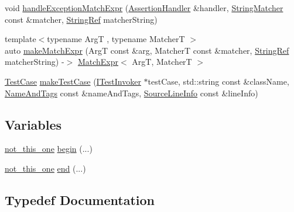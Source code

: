 \begin{DoxyCompactItemize}
\item 
void \mbox{\hyperlink{namespace_catch_a59e375ed0dbd3d6e2f5a29c86c4d8042}{handle\+Exception\+Match\+Expr}} (\mbox{\hyperlink{class_catch_1_1_assertion_handler}{Assertion\+Handler}} \&handler, \mbox{\hyperlink{namespace_catch_aba438977e831821a2eeca82b9b4f4af2}{String\+Matcher}} const \&matcher, \mbox{\hyperlink{class_catch_1_1_string_ref}{String\+Ref}} matcher\+String)
\item 
{\footnotesize template$<$typename ArgT , typename MatcherT $>$ }\\auto \mbox{\hyperlink{namespace_catch_a08c0e847b66dc31e1174aa9a74a441c9}{make\+Match\+Expr}} (ArgT const \&arg, MatcherT const \&matcher, \mbox{\hyperlink{class_catch_1_1_string_ref}{String\+Ref}} matcher\+String) -\/$>$ \mbox{\hyperlink{class_catch_1_1_match_expr}{Match\+Expr}}$<$ ArgT, MatcherT $>$
\item 
\mbox{\hyperlink{class_catch_1_1_test_case}{Test\+Case}} \mbox{\hyperlink{namespace_catch_a5e63df38d06a43d4cee17454e724b5c0}{make\+Test\+Case}} (\mbox{\hyperlink{struct_catch_1_1_i_test_invoker}{I\+Test\+Invoker}} $\ast$test\+Case, std\+::string const \&class\+Name, \mbox{\hyperlink{struct_catch_1_1_name_and_tags}{Name\+And\+Tags}} const \&name\+And\+Tags, \mbox{\hyperlink{struct_catch_1_1_source_line_info}{Source\+Line\+Info}} const \&line\+Info)
\end{DoxyCompactItemize}
\subsection*{Variables}
\begin{DoxyCompactItemize}
\item 
\mbox{\hyperlink{struct_catch_1_1not__this__one}{not\+\_\+this\+\_\+one}} \mbox{\hyperlink{namespace_catch_ac7ccff5c186bffa3b448b218ecf15956}{begin}} (...)
\item 
\mbox{\hyperlink{struct_catch_1_1not__this__one}{not\+\_\+this\+\_\+one}} \mbox{\hyperlink{namespace_catch_a71fef6a57614eb2d9751f8586ff6de6a}{end}} (...)
\end{DoxyCompactItemize}


\subsection{Typedef Documentation}
\mbox{\label{namespace_catch_ae8d8673884dc36b98875106322a2a37b}} 
